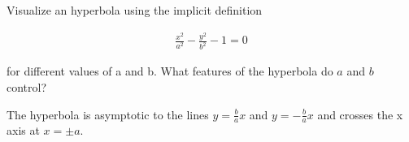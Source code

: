 Visualize an hyperbola using the implicit definition

\begin{align*}
    \frac{x^2}{a^2} - \frac{y^2}{b^2} - 1 = 0
\end{align*}

for different values of a and b. What features of the hyperbola do $a$ and $b$ control?

\begin{solution}
    The hyperbola is asymptotic to the lines $y = \frac{b}{a}x$ and $y = -\frac{b}{a}x$ and crosses the x axis at $x = \pm a$.
\end{solution}